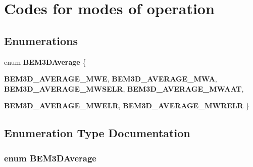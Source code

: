 \section{Codes for modes of operation}
\label{group__codes}
\subsection*{Enumerations}
\begin{CompactItemize}
\item 
enum {\bf BEM3DAverage} \{ \par
{\bf BEM3D\_\-AVERAGE\_\-MWE}, 
{\bf BEM3D\_\-AVERAGE\_\-MWA}, 
{\bf BEM3D\_\-AVERAGE\_\-MWSELR}, 
{\bf BEM3D\_\-AVERAGE\_\-MWAAT}, 
\par
{\bf BEM3D\_\-AVERAGE\_\-MWELR}, 
{\bf BEM3D\_\-AVERAGE\_\-MWRELR}
 \}
\end{CompactItemize}


\subsection{Enumeration Type Documentation}
\subsubsection{\setlength{\rightskip}{0pt plus 5cm}enum {\bf BEM3DAverage}}\label{group__codes_gb4643c303f563fb00005135a808e33ba}


